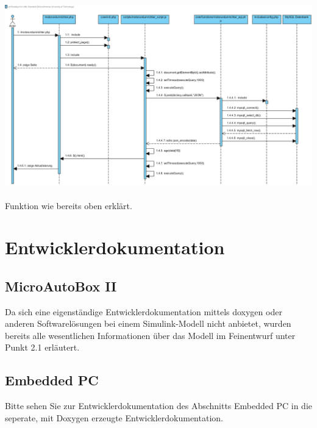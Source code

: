 \documentclass[fontsize = 12pt, paper = a4]{scrreprt}
\begin{document}
\includegraphics[scale=0.5]{motorundumrichter.png}
\\ \\
Funktion wie bereits oben erklärt.







\chapter{Entwicklerdokumentation}




\section{MicroAutoBox II}

Da sich eine eigenständige Entwicklerdokumentation mittels doxygen oder anderen Softwarelösungen bei einem Simulink-Modell nicht anbietet, wurden bereits alle wesentlichen Informationen über das Modell im Feinentwurf unter Punkt 2.1 erläutert.


\section{Embedded PC}

Bitte sehen Sie zur Entwicklerdokumentation des Abschnitts Embedded PC in die seperate, mit Doxygen erzeugte Entwicklerdokumentation.

\end{document}
